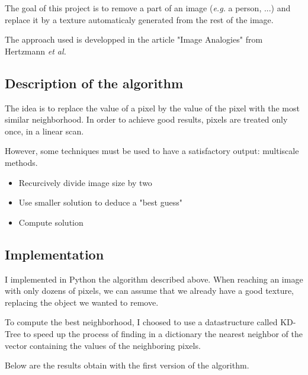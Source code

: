 \documentclass[a4paper]{article}
\begin{document}
  The goal of this project is to remove a part of an image (\textit{e.g.} a person, ...) and replace it by a texture automaticaly generated from the rest of the image.
  
  \medskip The approach used is developped in the article "Image Analogies" from Hertzmann \textit{et al.}
  
  \subsection{Description of the algorithm}
  
  The idea is to replace the value of a pixel by the value of the pixel with the most similar neighborhood. In order to achieve good results, pixels are treated only once, in a linear scan.
  
  \medskip However, some techniques must be used to have a satisfactory output: multiscale methods.
  \begin{itemize}
    \item Recurcively divide image size by two
    \item Use smaller solution to deduce a "best guess"
    \item Compute solution
  \end{itemize}
  
  \subsection{Implementation}
  
  I implemented in Python the algorithm described above. When reaching an image with only dozens of pixels, we can assume that we already have a good texture, replacing the object we wanted to remove.
  
  \medskip To compute the best neighborhood, I choosed to use a datastructure called KD-Tree to speed up the process of finding in a dictionary the nearest neighbor of the vector containing the values of the neighboring pixels.
  
  \medskip Below are the results obtain with the first version of the algorithm.
  
\end{document}
